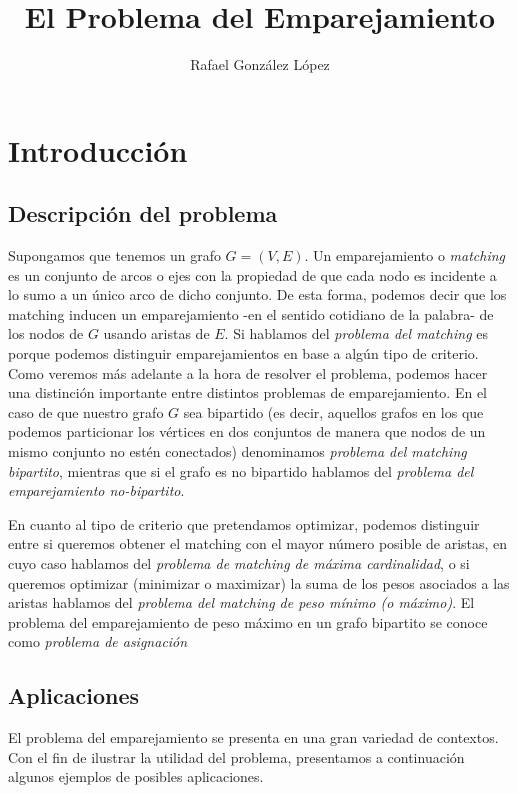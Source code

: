 \documentclass[twoside,12pt]{article}
\begin{document}
\title{El Problema del Emparejamiento}
\author{Rafael González López}
\maketitle
\section{Introducción}
\subsection{Descripción del problema}
Supongamos que tenemos un grafo $G=(V,E)$. Un emparejamiento o \textit{matching} es un conjunto de arcos o ejes con la propiedad de que cada nodo es incidente a lo sumo a un único arco de dicho conjunto. De esta forma, podemos decir que los matching inducen un emparejamiento -en el sentido cotidiano de la palabra- de los nodos de $G$ usando aristas de $E$. Si hablamos del \textit{problema del matching} es porque podemos distinguir emparejamientos en base a algún tipo de criterio. Como veremos más adelante a la hora de resolver el problema, podemos hacer una distinción importante entre distintos problemas de emparejamiento. En el caso de que nuestro grafo $G$ sea bipartido (es decir, aquellos grafos en los que podemos particionar los vértices en dos conjuntos de manera que nodos de un mismo conjunto no estén conectados) denominamos \textit{problema del matching bipartito}, mientras que si el grafo es no bipartido hablamos del \textit{problema del emparejamiento no-bipartito}.  

En cuanto al tipo de criterio que pretendamos optimizar, podemos distinguir entre si queremos obtener el matching con el mayor número posible de aristas, en cuyo caso hablamos del \textit{problema de matching de máxima cardinalidad}, o si queremos optimizar (minimizar o maximizar) la suma de los pesos asociados a las aristas hablamos del \textit{problema del matching de peso mínimo (o máximo)}. El problema del emparejamiento de peso máximo en un grafo bipartito se conoce como \textit{problema de asignación} 

\subsection{Aplicaciones}
El problema del emparejamiento se presenta en una gran variedad de contextos. Con el fin de ilustrar la utilidad del problema, presentamos a continuación algunos ejemplos de posibles aplicaciones.
\end{document}
